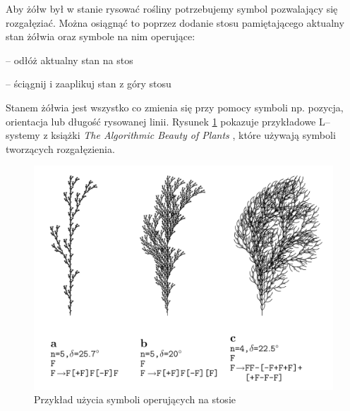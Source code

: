 \documentclass[inz,longabstract]{iithesis}
\begin{document}
        Aby żółw był w stanie rysować rośliny potrzebujemy symbol pozwalający się rozgałęziać. Można osiągnąć to poprzez dodanie stosu pamiętającego aktualny stan żółwia oraz symbole na nim operujące:
        \begin{description}[itemsep=2pt, parsep=2pt, topsep=2pt, partopsep=2pt]
            \item[{[}] -- odłóż aktualny stan na stos
            \item[{]}] -- ściągnij i zaaplikuj stan z góry stosu 
        \end{description}
        Stanem żółwia jest wszystko co zmienia się przy pomocy symboli np. pozycja, orientacja lub długość rysowanej linii. Rysunek \ref{fig:lsystemPlants} pokazuje przykładowe L--systemy z książki \textit{The Algorithmic Beauty of Plants}  \cite{plants}, które używają symboli tworzących rozgałęzienia. 
        \begin{figure}[H]
            \includegraphics[width=\linewidth]{lsystemPlants.png}
            \caption{Przykład użycia symboli operujących na stosie \cite{plants}} 
            \label{fig:lsystemPlants}
        \end{figure}
        
\end{document}
